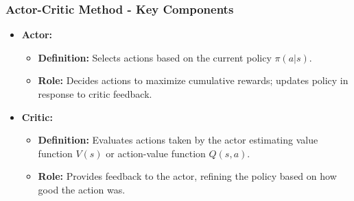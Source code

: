\documentclass{beamer}
\begin{document}
\begin{frame}[fragile]
    \frametitle{Actor-Critic Method - Key Components}
    \begin{itemize}
        \item \textbf{Actor:}
            \begin{itemize}
                \item \textbf{Definition:} Selects actions based on the current policy \( \pi(a | s) \).
                \item \textbf{Role:} Decides actions to maximize cumulative rewards; updates policy in response to critic feedback.
            \end{itemize}

        \item \textbf{Critic:}
            \begin{itemize}
                \item \textbf{Definition:} Evaluates actions taken by the actor estimating value function \( V(s) \) or action-value function \( Q(s, a) \).
                \item \textbf{Role:} Provides feedback to the actor, refining the policy based on how good the action was.
            \end{itemize}
    \end{itemize}
\end{frame}
\end{document}

